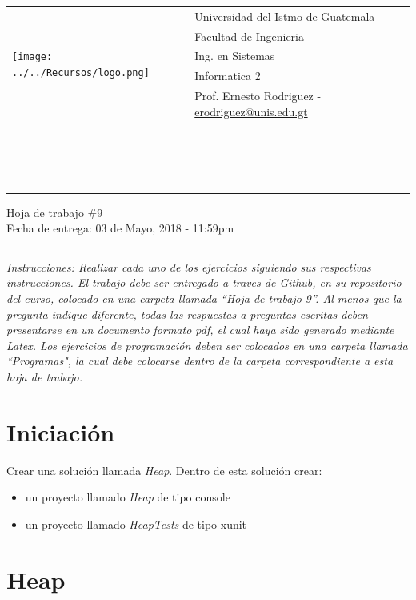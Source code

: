 \documentclass{article}
\newcommand{\horrule}[1]{\rule{\linewidth}{#1}}
\begin{document}
\begin{tabular}{l l}
\multirow{5}{*}{\texttt{[image: ../../Recursos/logo.png]}} & Universidad del Istmo de Guatemala \\
 & Facultad de Ingenieria \\
 & Ing. en Sistemas \\
 & Informatica 2 \\
 & Prof. Ernesto Rodriguez - \href{mailto:erodriguez@unis.edu.gt}{erodriguez@unis.edu.gt} \\
\end{tabular}
\\\\\\

\begin{center}
        \horrule{0.5pt}
        \huge{Hoja de trabajo \#9} \\
        \large{Fecha de entrega: 03 de Mayo, 2018 - 11:59pm} \\
        \horrule{1pt}
\end{center}
\emph{Instrucciones: Realizar cada uno de los ejercicios siguiendo sus respectivas
instrucciones. El trabajo debe ser entregado a traves de Github, en su repositorio del curso, colocado en una carpeta llamada ``Hoja de trabajo 9''.
Al menos que la pregunta indique diferente, todas las respuestas a preguntas escritas deben presentarse en
un documento formato pdf, el cual haya sido generado mediante Latex. Los ejercicios de programaci\'on deben ser colocados en una carpeta
llamada ``Programas", la cual debe colocarse dentro de la carpeta correspondiente a esta hoja de trabajo.}

\section*{Iniciaci\'on}

Crear una soluci\'on llamada \emph{Heap}. Dentro de esta soluci\'on crear:
\begin{itemize}
        \item{un proyecto llamado \emph{Heap} de tipo console}
        \item{un proyecto llamado \emph{HeapTests} de tipo xunit}
\end{itemize}

\section*{Heap}
\end{document}
